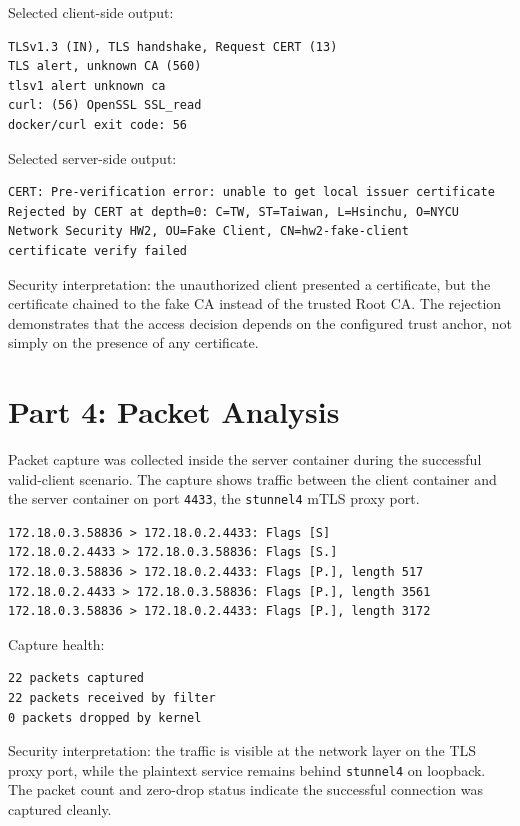 \documentclass[11pt]{article}
\begin{document}
Selected client-side output:

\begin{lstlisting}
TLSv1.3 (IN), TLS handshake, Request CERT (13)
TLS alert, unknown CA (560)
tlsv1 alert unknown ca
curl: (56) OpenSSL SSL_read
docker/curl exit code: 56
\end{lstlisting}

Selected server-side output:

\begin{lstlisting}
CERT: Pre-verification error: unable to get local issuer certificate
Rejected by CERT at depth=0: C=TW, ST=Taiwan, L=Hsinchu, O=NYCU Network Security HW2, OU=Fake Client, CN=hw2-fake-client
certificate verify failed
\end{lstlisting}

Security interpretation: the unauthorized client presented a certificate, but the certificate chained to the fake CA instead of the trusted Root CA. The rejection demonstrates that the access decision depends on the configured trust anchor, not simply on the presence of any certificate.

\section{Part 4: Packet Analysis}

Packet capture was collected inside the server container during the successful valid-client scenario. The capture shows traffic between the client container and the server container on port \texttt{4433}, the \texttt{stunnel4} mTLS proxy port.

\begin{lstlisting}
172.18.0.3.58836 > 172.18.0.2.4433: Flags [S]
172.18.0.2.4433 > 172.18.0.3.58836: Flags [S.]
172.18.0.3.58836 > 172.18.0.2.4433: Flags [P.], length 517
172.18.0.2.4433 > 172.18.0.3.58836: Flags [P.], length 3561
172.18.0.3.58836 > 172.18.0.2.4433: Flags [P.], length 3172
\end{lstlisting}

Capture health:

\begin{lstlisting}
22 packets captured
22 packets received by filter
0 packets dropped by kernel
\end{lstlisting}

Security interpretation: the traffic is visible at the network layer on the TLS proxy port, while the plaintext service remains behind \texttt{stunnel4} on loopback. The packet count and zero-drop status indicate the successful connection was captured cleanly.
\end{document}
